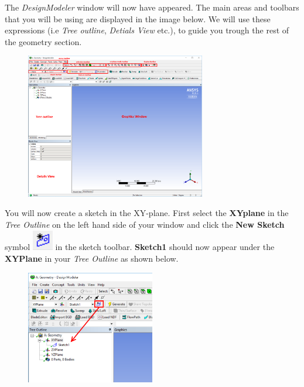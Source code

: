\documentclass[11pt,a4paper,oneside]{scrartcl}
\newcommand\bfr[1]{\textcolor[rgb]{1,0.00,0.00}{\textbf{\textsf{#1}}}}
\begin{document}
The \emph{DesignModeler} window will now have appeared. The main areas and toolbars that you will be using are displayed in the image below. We will use these expressions (i.e \emph{Tree outline}, \emph{Detials View} etc.), to guide you trough the rest of the geometry section.

\begin{figure}[H]
\begin{center}
\includegraphics[width=0.7\textwidth,clip]{Designmodeller_GUI.png}
\end{center}
\end{figure}

You will now create a sketch in the XY-plane.  First select the \bfr{XYplane} in the \emph{Tree Outline} on the left hand side of your window and click the \bfr{New Sketch} symbol \includegraphics[width=.4cm]{newsketch_symbol.png} in the sketch toolbar. \bfr{Sketch1} should now appear under the \bfr{XYPlane} in your \emph{Tree Outline} as shown below.
\begin{figure}[H]
\begin{center}
\includegraphics[width=0.5\textwidth,clip]{newsketch.png}
\end{center}
\end{figure}
\end{document}
